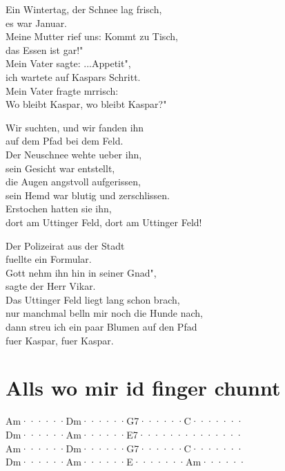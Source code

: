 \documentclass[
  letterpaper,
]{scrbook}
\begin{document}
Ein Wintertag, der Schnee lag frisch,\\
es war Januar.\\
Meine Mutter rief uns: Kommt zu Tisch,\\
das Essen ist gar!"\\
Mein Vater sagte: ...Appetit",\\
ich wartete auf Kaspars Schritt.\\
Mein Vater fragte mrrisch:\\
Wo bleibt Kaspar, wo bleibt Kaspar?"

Wir suchten, und wir fanden ihn\\
auf dem Pfad bei dem Feld.\\
Der Neuschnee wehte ueber ihn,\\
sein Gesicht war entstellt,\\
die Augen angstvoll aufgerissen,\\
sein Hemd war blutig und zerschlissen.\\
Erstochen hatten sie ihn,\\
dort am Uttinger Feld, dort am Uttinger Feld!

Der Polizeirat aus der Stadt\\
fuellte ein Formular.\\
Gott nehm\textquotesingle{} ihn hin in seiner Gnad"\textquotesingle,\\
sagte der Herr Vikar.\\
Das Uttinger Feld liegt lang schon brach,\\
nur manchmal bell\textquotesingle n mir noch die Hunde nach,\\
dann streu\textquotesingle{} ich ein paar Blumen auf den Pfad\\
fuer Kaspar, fuer Kaspar.

\hypertarget{alls-wo-mir-id-finger-chunnt}{%
\chapter{Alls wo mir id finger
chunnt}\label{alls-wo-mir-id-finger-chunnt}}

\textbar Am······\textbar Dm······\textbar G7······\textbar C·······\textbar{}\\
\textbar Dm······\textbar Am······\textbar E7······\textbar········\textbar{}\\
\textbar Am······\textbar Dm······\textbar G7······\textbar C·······\textbar{}\\
\textbar Dm······\textbar Am······\textbar E·······\textbar Am······\textbar{}
\end{document}
